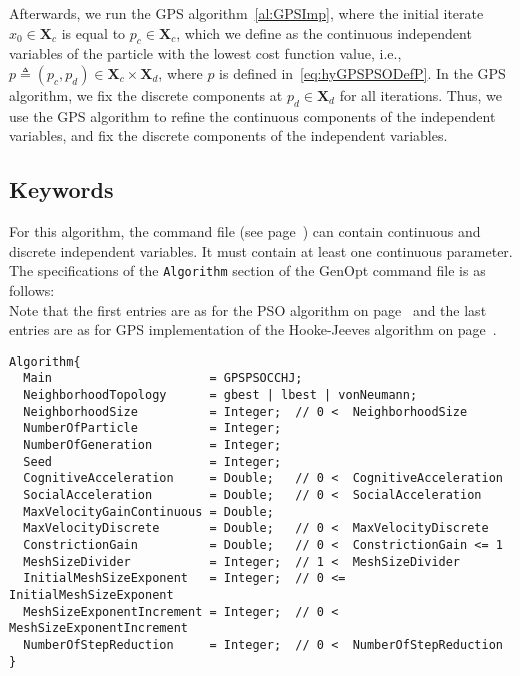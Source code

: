 Afterwards, we run the GPS algorithm~\ref{al:GPSImp},
where the initial iterate $x_0 \in \mathbf X_c$ 
is equal to $p_c \in \mathbf X_c$, which we
define as the continuous independent variables of the particle with the lowest cost
function value, i.e., $p \triangleq (p_c, p_d) \in \mathbf X_c \times \mathbf X_d$,
where $p$ is defined in~\eqref{eq:hyGPSPSODefP}.
In the GPS algorithm, we fix the discrete components at $p_d \in \mathbf X_d$
for all iterations.
Thus, we use the GPS algorithm to refine the continuous components of the independent variables, 
and fix the discrete components of the independent variables.


\subsection{Keywords}
For this algorithm, 
the command file (see page~\pageref{par:comFil})
can contain continuous and discrete independent variables.
It must contain at least one continuous parameter.\\

The specifications of the \texttt{Algorithm} section 
of the GenOpt command file is as follows:\\

Note that the first entries are as for the PSO algorithm
on page~\pageref{algSec:PSOCCMesh} and the last entries
are as for GPS implementation of the Hooke-Jeeves algorithm 
on page~\pageref{algSec:GPSHookeJeeves}.
\begin{lstlisting}
Algorithm{
  Main                      = GPSPSOCCHJ;
  NeighborhoodTopology      = gbest | lbest | vonNeumann;
  NeighborhoodSize          = Integer;  // 0 <  NeighborhoodSize
  NumberOfParticle          = Integer;
  NumberOfGeneration        = Integer;
  Seed                      = Integer;
  CognitiveAcceleration     = Double;   // 0 <  CognitiveAcceleration
  SocialAcceleration        = Double;   // 0 <  SocialAcceleration
  MaxVelocityGainContinuous = Double;
  MaxVelocityDiscrete       = Double;   // 0 <  MaxVelocityDiscrete
  ConstrictionGain          = Double;   // 0 <  ConstrictionGain <= 1
  MeshSizeDivider           = Integer;  // 1 <  MeshSizeDivider
  InitialMeshSizeExponent   = Integer;  // 0 <= InitialMeshSizeExponent
  MeshSizeExponentIncrement = Integer;  // 0 <  MeshSizeExponentIncrement
  NumberOfStepReduction     = Integer;  // 0 <  NumberOfStepReduction
}
\end{lstlisting}

